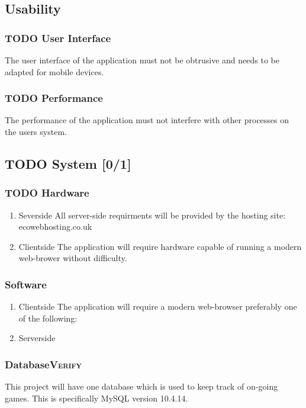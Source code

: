 \documentclass[11pt]{article}
\begin{document}
\subsection{Usability}
\label{sec:org21fd7ff}
\subsubsection{{\bfseries\sffamily TODO} User Interface}
\label{sec:orgfb71b0d}
The user interface of the application must not be obtrusive and
needs to be adapted for mobile devices.
\subsubsection{{\bfseries\sffamily TODO} Performance}
\label{sec:org9ca7aa3}
The performance of the application must not interfere with other
processes on the users system.
\subsection{{\bfseries\sffamily TODO} System [0/1]}
\label{sec:orgc71e5c5}
\subsubsection{{\bfseries\sffamily TODO} Hardware}
\label{sec:orgdea7994}
\begin{enumerate}
\item Severside
\label{sec:orga46d2e7}
All server-side requirments will be provided by the hosting site: ecowebhosting.co.uk
\item Clientside
\label{sec:org7e507a7}
The application will require hardware capable of running a modern web-brower without difficulty.
\end{enumerate}
\subsubsection{Software}
\label{sec:org16b053a}
\begin{enumerate}
\item Clientside
\label{sec:org1bb0ce1}
The application will require a modern web-browser preferably one
of the following:

\item Serverside
\label{sec:orgb829c08}
\end{enumerate}

\subsubsection{Database\hfill{}\textsc{Verify}}
\label{sec:org2421a77}
This project will have one database which is used to keep track of
on-going games. This is specifically MySQL version 10.4.14.
\end{document}
